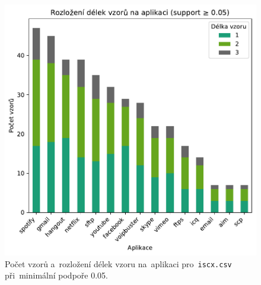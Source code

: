 \begin{figure}[H]
\begin{minipage}[t]{0.49\textwidth}
        \includegraphics[width=\linewidth]{obrazky-figures/exps/pattern_lengths_0.05_iscx.pdf}

            \caption{Počet vzorů a~rozložení délek vzoru na~aplikaci pro~\texttt{iscx.csv} při~minimální podpoře 0.05.}
        \label{fig:appendix-}
    \end{minipage}
\end{figure}

